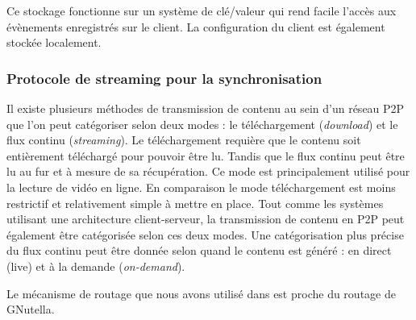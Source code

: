 Ce stockage fonctionne sur un système de clé/valeur qui rend facile l'accès aux 
évènements enregistrés sur le client. La configuration du client est également 
stockée localement. 

\subsubsection{Protocole de streaming pour la synchronisation}
\label{streamingprotocol}

Il existe plusieurs méthodes de transmission de contenu au sein d'un réseau P2P 
que l'on peut catégoriser selon deux modes : le téléchargement (\textit{download}) 
et le flux continu (\textit{streaming}). Le téléchargement requière que le contenu 
soit entièrement téléchargé pour pouvoir être lu. Tandis que le flux continu peut 
être lu au fur et à mesure de sa récupération. Ce mode est principalement utilisé 
pour la lecture de vidéo en ligne. En comparaison le mode téléchargement est 
moins restrictif et relativement simple à mettre en place. Tout comme les 
systèmes utilisant une architecture client-serveur, la transmission de contenu en 
P2P peut également être catégorisée selon ces deux modes. Une catégorisation 
plus précise du flux continu peut être donnée selon quand le contenu est généré : 
en direct (live) et à la demande (\textit{on-demand}).


Le mécanisme de routage que nous avons utilisé dans \cite{Desprat2015a} est 
proche du routage de GNutella. 


